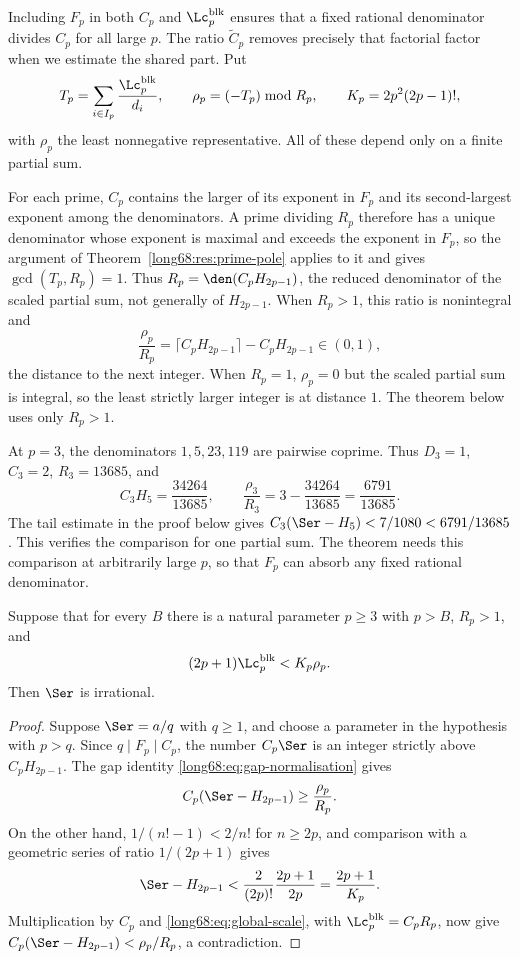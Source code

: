 Including $F_p$ in both $C_p$ and $\Lc_p^{\mathrm{blk}}$ ensures that
a fixed rational denominator divides $C_p$ for all large $p$.
The ratio $\widetilde C_p$ removes precisely that factorial factor when
we estimate the shared part. Put
\[
 T_p=\sum_{i\in I_p}\frac{\Lc^{\mathrm{blk}}_p}{d_i},\qquad
 \rho_p=(-T_p)\bmod R_p,\qquad
 K_p=2p^2(2p-1)! ,
\]
with $\rho_p$ the least nonnegative representative.  All of these depend only
on a finite partial sum.

For each prime, $C_p$ contains the larger of its exponent in $F_p$ and
its second-largest exponent among the denominators.  A prime dividing $R_p$ therefore has a unique
denominator whose exponent is maximal and exceeds the exponent in $F_p$, so the argument of
Theorem~\ref{long68:res:prime-pole} applies to it and gives $\gcd(T_p,R_p)=1$.
Thus $R_p=\den(C_pH_{2p-1})$, the reduced denominator of the scaled
partial sum, not generally of $H_{2p-1}$. When $R_p>1$, this ratio is
nonintegral and
\begin{equation}\label{long68:eq:gap-normalisation}
 \frac{\rho_p}{R_p}
 =\bigl\lceil C_pH_{2p-1}\bigr\rceil-C_pH_{2p-1}\in(0,1),
\end{equation}
the distance to the next integer. When $R_p=1$, $\rho_p=0$ but the
scaled partial sum is integral, so the least strictly larger integer is at
distance $1$. The theorem below uses only $R_p>1$.

At $p=3$, the denominators $1,5,23,119$ are pairwise coprime. Thus $D_3=1$,
$C_3=2$, $R_3=13685$, and
\[
C_3H_5=\frac{34264}{13685},\qquad
\frac{\rho_3}{R_3}=3-\frac{34264}{13685}=\frac{6791}{13685}.
\]
The tail estimate in the proof below gives
$C_3(\Ser-H_5)<7/1080<6791/13685$. This verifies the comparison for one
partial sum. The theorem needs this comparison at arbitrarily large $p$,
so that $F_p$ can absorb any fixed rational denominator.

\begin{theorem}\label{long68:res:global-residue}
Suppose that for every $B$ there is a natural parameter $p\ge3$ with
$p>B$, $R_p>1$, and
\begin{equation}\label{long68:eq:global-scale}
 (2p+1)\Lc^{\mathrm{blk}}_p<K_p\rho_p .
\end{equation}
Then $\Ser$ is irrational.
\end{theorem}

\begin{proof}
Suppose $\Ser=a/q$ with $q\ge1$, and choose a parameter in the hypothesis
with $p>q$. Since $q\mid F_p\mid C_p$, the number $C_p\Ser$ is an integer
strictly above $C_pH_{2p-1}$. The gap identity
\eqref{long68:eq:gap-normalisation} gives
\[
 C_p(\Ser-H_{2p-1})\ge\frac{\rho_p}{R_p}.
\]
On the other hand, $1/(n!-1)<2/n!$ for $n\ge2p$, and comparison with a
geometric series of ratio $1/(2p+1)$ gives
\[
 \Ser-H_{2p-1}<\frac{2}{(2p)!}\frac{2p+1}{2p}=\frac{2p+1}{K_p}.
\]
Multiplication by $C_p$ and \eqref{long68:eq:global-scale}, with
$\Lc_p^{\mathrm{blk}}=C_pR_p$, now give
$C_p(\Ser-H_{2p-1})<\rho_p/R_p$, a contradiction.
\end{proof}


